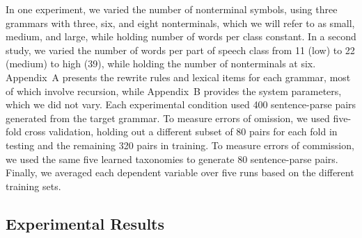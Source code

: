 \documentclass[11pt,letterpaper]{article}
\def\trellis/{{\sc Trellis}}
\begin{document}
In one experiment, we varied the number of nonterminal symbols, using
three grammars with three, six, and eight nonterminals, which we will 
refer to as small, medium, and large, while holding number of words 
per class constant. In a second study, we varied the number of words 
per part of speech class from 11 (low) to 22 (medium) to high (39), 
while holding the number of nonterminals at six. Appendix~A presents 
the rewrite rules and lexical items for each grammar, most of which
involve recursion, while Appendix~B provides the system parameters,
which we did not vary. Each experimental condition used 400
sentence-parse pairs generated from the target grammar. To measure
errors of omission, we used five-fold cross validation, holding out
a different subset of 80 pairs for each fold in testing and the
remaining 320 pairs in training. To measure errors of commission, we
used the same five learned taxonomies to generate 80 sentence-parse
pairs. Finally, we averaged each dependent variable over five runs based
on the different training sets.





\subsection{Experimental Results}

\end{document}

